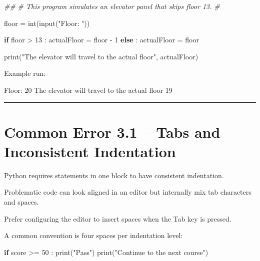 \documentclass[
  11pt,
  a4paper,
]{article}
\newenvironment{Shaded}{}{}
\newcommand{\BuiltInTok}[1]{\textcolor[rgb]{0.00,0.50,0.00}{#1}}
\newcommand{\CommentTok}[1]{\textcolor[rgb]{0.38,0.63,0.69}{\textit{#1}}}
\newcommand{\ControlFlowTok}[1]{\textcolor[rgb]{0.00,0.44,0.13}{\textbf{#1}}}
\newcommand{\DecValTok}[1]{\textcolor[rgb]{0.25,0.63,0.44}{#1}}
\newcommand{\NormalTok}[1]{#1}
\newcommand{\OperatorTok}[1]{\textcolor[rgb]{0.40,0.40,0.40}{#1}}
\newcommand{\StringTok}[1]{\textcolor[rgb]{0.25,0.44,0.63}{#1}}
\begin{document}
\begin{Shaded}
\begin{Highlighting}[]
\CommentTok{\#\#}
\CommentTok{\# This program simulates an elevator panel that skips floor 13.}
\CommentTok{\#}

\NormalTok{floor }\OperatorTok{=} \BuiltInTok{int}\NormalTok{(}\BuiltInTok{input}\NormalTok{(}\StringTok{"Floor: "}\NormalTok{))}

\ControlFlowTok{if}\NormalTok{ floor }\OperatorTok{\textgreater{}} \DecValTok{13}\NormalTok{ :}
\NormalTok{    actualFloor }\OperatorTok{=}\NormalTok{ floor }\OperatorTok{{-}} \DecValTok{1}
\ControlFlowTok{else}\NormalTok{ :}
\NormalTok{    actualFloor }\OperatorTok{=}\NormalTok{ floor}

\BuiltInTok{print}\NormalTok{(}\StringTok{"The elevator will travel to the actual floor"}\NormalTok{, actualFloor)}
\end{Highlighting}
\end{Shaded}

Example run:

\begin{Shaded}
\begin{Highlighting}[]
\NormalTok{Floor: 20}
\NormalTok{The elevator will travel to the actual floor 19}
\end{Highlighting}
\end{Shaded}

\begin{center}\rule{0.5\linewidth}{0.5pt}\end{center}

\section{Common Error 3.1 -- Tabs and Inconsistent
Indentation}\label{common-error-3.1-tabs-and-inconsistent-indentation}

Python requires statements in one block to have consistent indentation.

Problematic code can look aligned in an editor but internally mix tab
characters and spaces.

Prefer configuring the editor to insert spaces when the Tab key is
pressed.

A common convention is four spaces per indentation level:

\begin{Shaded}
\begin{Highlighting}[]
\ControlFlowTok{if}\NormalTok{ score }\OperatorTok{\textgreater{}=} \DecValTok{50}\NormalTok{ :}
    \BuiltInTok{print}\NormalTok{(}\StringTok{"Pass"}\NormalTok{)}
    \BuiltInTok{print}\NormalTok{(}\StringTok{"Continue to the next course"}\NormalTok{)}
\end{Highlighting}
\end{Shaded}
\end{document}
